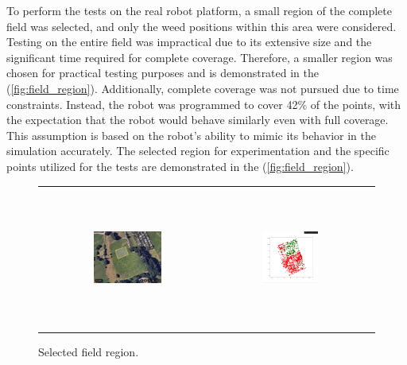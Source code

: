 To perform the tests on the real robot platform, a small region of the complete field was selected, and only the weed positions within this area were considered. Testing on the entire field was impractical due to its extensive size and the significant time required for complete coverage. Therefore, a smaller region was chosen for practical testing purposes and is demonstrated in the (\autoref{fig:field_region}). Additionally, complete coverage was not pursued due to time constraints. Instead, the robot was programmed to cover 42\% of the points, with the expectation that the robot would behave similarly even with full coverage. This assumption is based on the robot's ability to mimic its behavior in the simulation accurately. The selected region for experimentation and the specific points utilized for the tests are demonstrated in the (\autoref{fig:field_region}). 

\begin{figure}[H]
    \centering
    \begin{tabular}{ccc} 
        \includegraphics[height=46mm,width=0.4\textwidth]{Images/real_robot/field_with_region.png}
        & \includegraphics[height=46mm,width=0.4\textwidth]{Images/real_robot/field_region_points.png} 

    \end{tabular}
    \caption{Selected field region.\label{fig:field_region}} 
\end{figure}



\vspace*{6mm}   


